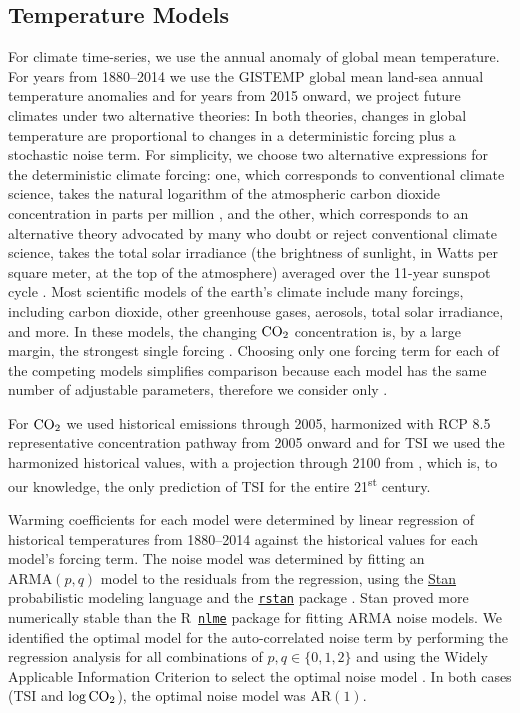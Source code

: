 \documentclass{wscpaperproc}\usepackage[]{graphicx}\usepackage[]{color}
\newcommand{\Rstat}{\textsf{R}}
\newcommand{\ARMA}{\text{ARMA}}
\newcommand{\AR}{\text{AR}}
\begin{document}
\subsection{Temperature Models}
\label{sec:temp.models}

For climate time-series, we use the annual anomaly of global mean temperature. For years from 1880--2014 we use the GISTEMP global mean land-sea annual temperature anomalies  and for years from 2015 onward, we project future climates under two alternative theories: In both theories, changes in global temperature are proportional to changes in a deterministic forcing plus a stochastic noise term. For simplicity, we choose two alternative expressions for the deterministic climate forcing: one, which corresponds to conventional climate science, takes the natural logarithm of the atmospheric carbon dioxide concentration in parts per million , and the other, which corresponds to an alternative theory advocated by many who doubt or reject conventional climate science, takes the total solar irradiance (the brightness of sunlight, in Watts per square meter, at the top of the atmosphere) averaged over the 11-year sunspot cycle .  Most scientific models of the earth's climate include many forcings, including carbon dioxide, other greenhouse gases, aerosols, total solar irradiance, and more. In these models, the changing $\ce{CO2}$ concentration is, by a large margin, the strongest single forcing . Choosing only one forcing term for each of the competing models simplifies comparison because each model has the same number of adjustable parameters, therefore we consider only .

For $\ce{CO2}$ we used historical emissions through 2005, harmonized with RCP 8.5 representative concentration pathway from 2005 onward  and for TSI we used the harmonized historical values, with a projection through 2100 from , which is, to our knowledge, the only prediction of TSI for the entire 21\textsuperscript{st} century.

Warming coefficients for each model were determined by linear regression of historical temperatures from 1880--2014 against the historical values for each model's forcing term. The noise model was determined by fitting an $\ARMA(p,q)$ model to the residuals from the regression, using the \href{http://mc-stan.org}{Stan} probabilistic modeling language and the \href{https://cran.r-project.org/web/packages/rstan/}{\texttt{rstan}} package . Stan proved more numerically stable than the \Rstat\ \href{http://CRAN.R-project.org/package=nlme}{\texttt{nlme}} package
for fitting ARMA noise models. We identified the optimal model for the auto-correlated noise term by performing the regression analysis for all combinations of $p, q \in \lbrace 0,1,2 \rbrace$ and using the Widely Applicable Information Criterion to select the optimal noise model . In both cases (TSI and $\log\ce{CO2}$), the optimal noise model was $\AR(1)$.
\end{document}
